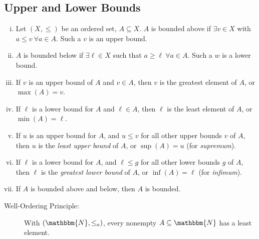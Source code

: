 \documentclass[10pt]{extarticle}
\newcommand{\N}{\mathbbm{N}}
\begin{document}
      \subsection{Upper and Lower Bounds}%
        \begin{enumerate}[(i)]
          \item Let $(X,\leq)$ be an ordered set, $A\subseteq X$. $A$ is bounded above if $\exists v\in X$ with $a\leq v~\forall a\in A$. Such a $v$ is an upper bound.
          \item $A$ is bounded below if $\exists \ell\in X$ such that $a\geq \ell~\forall a\in A$. Such a $w$ is a lower bound.
          \item If $v$ is an upper bound of $A$ and $v\in A$, then $v$ is the greatest element of $A$, or $\max(A) = v$.
          \item If $\ell$ is a lower bound for $A$ and $\ell\in A$, then $\ell$ is the least element of $A$, or $\min(A) = \ell$.
          \item If $u$ is an upper bound for $A$, and $u \leq v$ for all other upper bounds $v$ of $A$, then $u$ is the \textsl{least upper bound} of $A$, or $\sup(A) = u$ (for \textit{supremum}).
          \item If $\ell$ is a lower bound for $A$, and $\ell \leq g$ for all other lower bounds $g$ of $A$, then $\ell$ is the \textsl{greatest lower bound} of $A$, or $\inf(A) = \ell$ (for \textit{infimum}).
          \item If $A$ is bounded above and below, then $A$ is bounded.
        \end{enumerate}
        \begin{description}
          \item[Well-Ordering Principle:] With $(\N,\leq_a)$, every nonempty $A\subseteq \N$ has a least element.
        \end{description}
\end{document}
